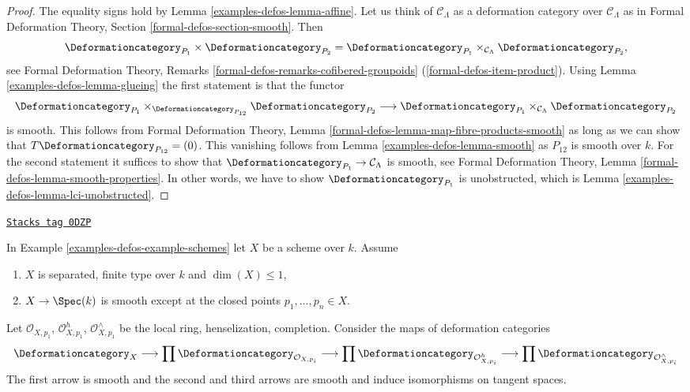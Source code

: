 \begin{proof}
The equality signs hold by Lemma \ref{examples-defos-lemma-affine}.
Let us think of $\mathcal{C}_\Lambda$ as a deformation
category over $\mathcal{C}_\Lambda$ as in
Formal Deformation Theory, Section \ref{formal-defos-section-smooth}.
Then
$$
\Deformationcategory_{P_1} \times \Deformationcategory_{P_2} =
\Deformationcategory_{P_1}
\times_{\mathcal{C}_\Lambda}
\Deformationcategory_{P_2},
$$
see Formal Deformation Theory, Remarks
\ref{formal-defos-remarks-cofibered-groupoids}
(\ref{formal-defos-item-product}).
Using
Lemma \ref{examples-defos-lemma-glueing}
the first statement is that the functor
$$
\Deformationcategory_{P_1}
\times_{\Deformationcategory_{P_{12}}}
\Deformationcategory_{P_2}
\longrightarrow
\Deformationcategory_{P_1}
\times_{\mathcal{C}_\Lambda}
\Deformationcategory_{P_2}
$$
is smooth. This follows from Formal Deformation Theory, Lemma
\ref{formal-defos-lemma-map-fibre-products-smooth} as long as
we can show that $T\Deformationcategory_{P_{12}} = (0)$.
This vanishing follows from Lemma \ref{examples-defos-lemma-smooth}
as $P_{12}$ is smooth over $k$.
For the second statement it suffices to show that
$\Deformationcategory_{P_1} \to \mathcal{C}_\Lambda$
is smooth, see Formal Deformation Theory, Lemma
\ref{formal-defos-lemma-smooth-properties}.
In other words, we have to show $\Deformationcategory_{P_1}$
is unobstructed, which is Lemma \ref{examples-defos-lemma-lci-unobstructed}.
\end{proof}

\begin{lemma}
\label{examples-defos-lemma-curve-isolated}
\href{https://stacks.math.columbia.edu/tag/0DZP}{\texttt{Stacks tag 0DZP}}

In Example \ref{examples-defos-example-schemes} let $X$ be a scheme over $k$. Assume
\begin{enumerate}
\item $X$ is separated, finite type over $k$ and $\dim(X) \leq 1$,
\item $X \to \Spec(k)$ is smooth except at the closed
points $p_1, \ldots, p_n \in X$.
\end{enumerate}
Let $\mathcal{O}_{X, p_1}$, $\mathcal{O}_{X, p_1}^h$,
$\mathcal{O}_{X, p_1}^\wedge$ be the local ring, henselization, completion.
Consider the maps of deformation categories
$$
\Deformationcategory_X
\longrightarrow
\prod \Deformationcategory_{\mathcal{O}_{X, p_i}}
\longrightarrow
\prod \Deformationcategory_{\mathcal{O}_{X, p_i}^h}
\longrightarrow
\prod \Deformationcategory_{\mathcal{O}_{X, p_i}^\wedge}
$$
The first arrow is smooth and the second and third arrows
are smooth and induce isomorphisms on tangent spaces.
\end{lemma}

